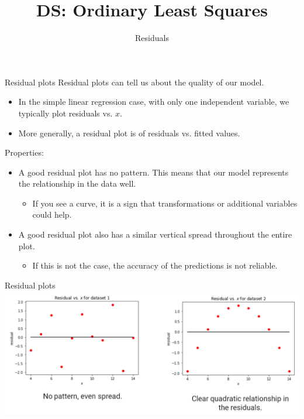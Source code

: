 \documentclass[aspectratio=169]{../latex_main/tntbeamer}  %
\title[Regression]{DS: Ordinary Least Squares}
\subtitle{Residuals}
\begin{document}
	
	\maketitle
	\begin{frame}{Residual plots}
	    Residual plots can tell us about the quality of our model.
	    \begin{itemize}
	        \item In the simple linear regression case, with only one independent variable, we typically plot residuals vs. $x$.
	        \item More generally, a residual plot is of residuals vs. fitted values.
	    \end{itemize}
	    Properties:
	    \begin{itemize}
	        \item A good residual plot has no pattern. This means that our model represents the relationship in the data well.
	        \begin{itemize}
	            \item If you see a curve, it is a sign that transformations or additional variables could help.
	        \end{itemize}
	        \item A good residual plot also has a similar vertical spread throughout the entire plot.
	        \begin{itemize}
	            \item If this is not the case, the accuracy of the predictions is not reliable.
	        \end{itemize}
	    \end{itemize}
	\end{frame}
	
	
	\begin{frame}{Residual plots}
	    \centering
	    \includegraphics[scale=.4]{Bild11}
	\end{frame}
	
\end{document}
